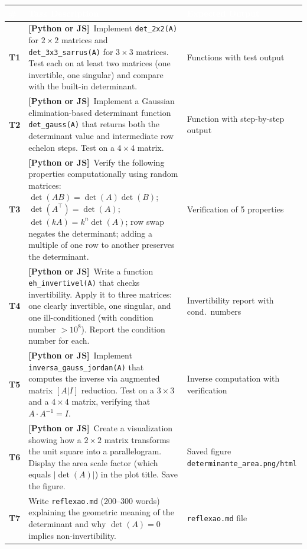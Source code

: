 \documentclass[a4paper,11pt]{article}
\newcommand{\bothlabel}{\textcolor{ippblue}{\textbf{[Python or JS]}}}
\begin{document}
\renewcommand{\arraystretch}{1.3}
\begin{tabularx}{\textwidth}{
  >{\centering\bfseries\cellcolor{lightblue}}p{0.8cm}
  X
  p{3.5cm}
}
\toprule
\rowcolor{ippblue}
\textcolor{white}{\#} & \textcolor{white}{\textbf{Task Description}} & \textcolor{white}{\textbf{Expected Output}} \\
\midrule
T1 & \bothlabel\ Implement \texttt{det\_2x2(A)} for $2 \times 2$ matrices and \texttt{det\_3x3\_sarrus(A)} for $3 \times 3$ matrices. Test each on at least two matrices (one invertible, one singular) and compare with the built-in determinant. & Functions with test output \\
\rowcolor{lightgray}
T2 & \bothlabel\ Implement a Gaussian elimination-based determinant function \texttt{det\_gauss(A)} that returns both the determinant value and intermediate row echelon steps. Test on a $4 \times 4$ matrix. & Function with step-by-step output \\
T3 & \bothlabel\ Verify the following properties computationally using random matrices: $\det(AB) = \det(A)\det(B)$;\; $\det(A^\top) = \det(A)$;\; $\det(kA) = k^n \det(A)$;\; row swap negates the determinant;\; adding a multiple of one row to another preserves the determinant. & Verification of 5 properties \\
\rowcolor{lightgray}
T4 & \bothlabel\ Write a function \texttt{eh\_invertivel(A)} that checks invertibility. Apply it to three matrices: one clearly invertible, one singular, and one ill-conditioned (with condition number $> 10^8$). Report the condition number for each. & Invertibility report with cond.\ numbers \\
T5 & \bothlabel\ Implement \texttt{inversa\_gauss\_jordan(A)} that computes the inverse via augmented matrix $[A|I]$ reduction. Test on a $3 \times 3$ and a $4 \times 4$ matrix, verifying that $A \cdot A^{-1} = I$. & Inverse computation with verification \\
\rowcolor{lightgray}
T6 & \bothlabel\ Create a visualization showing how a $2 \times 2$ matrix transforms the unit square into a parallelogram. Display the area scale factor (which equals $|\det(A)|$) in the plot title. Save the figure. & Saved figure \texttt{determinante\_area.png/html} \\
T7 & Write \texttt{reflexao.md} (200--300 words) explaining the geometric meaning of the determinant and why $\det(A) = 0$ implies non-invertibility. & \texttt{reflexao.md} file \\
\bottomrule
\end{tabularx}
\end{document}
